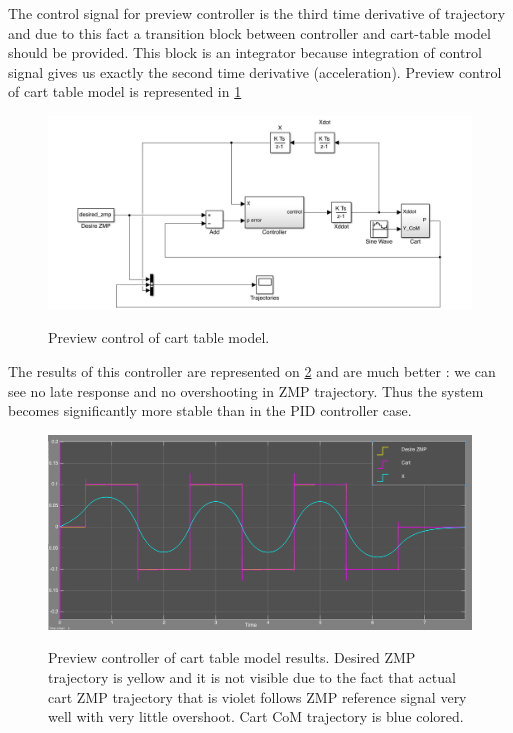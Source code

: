 \documentclass[12pt,a4paper]{report}
\begin{document}
				The control signal for preview controller is the third time derivative of trajectory and due to this fact a transition block between controller and cart-table model should be provided. This block is an integrator because integration of control signal gives us exactly the second time derivative (acceleration). Preview control of cart table model is represented in \cref{fig:20}
				
				\begin{figure}[H]
					\vspace{-0.2cm}
					\centering
					{\includegraphics[width=1\textwidth]{20}}
					\caption{Preview control of cart table model.}
					\label{fig:20}
					\vspace{-0.1cm}
				\end{figure}
				
				The results of this controller are represented on \cref{fig:19} and are much better : we can see no late response and no overshooting in ZMP trajectory. Thus the system becomes significantly more stable than in the PID controller case. 
				
				\begin{figure}[H]
					\vspace{-0.2cm}
					\centering
		 			{\includegraphics[width=1\textwidth]{19}}
					\caption{Preview controller of cart table model results. Desired ZMP trajectory is yellow and it is not visible due to the fact that actual cart ZMP trajectory that is violet follows ZMP reference signal very well with very little overshoot. Cart CoM trajectory is blue colored.}
					\label{fig:19}
					\vspace{-0.1cm}
				\end{figure}
				
\end{document}
